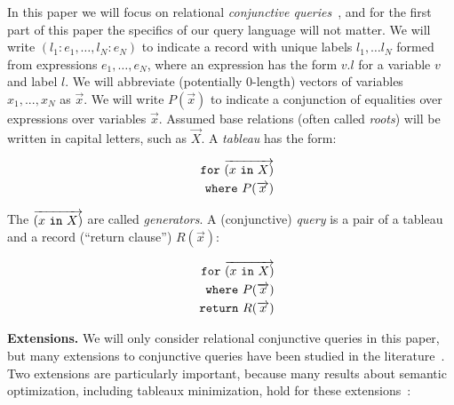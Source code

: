 \documentclass[preprint]{sigplanconf}
\newcommand{\FOR}{{\tt for} \ }
\newcommand{\WHERE}{{\tt where} \ }
\newcommand{\IN}{ \ {\tt in} \ }
\newcommand{\RETURN}{{\tt return} \ }
\begin{document}
In this paper we will focus on relational {\it conjunctive queries}~\cite{foundations}, and for the first part of this paper the specifics of our query language will not matter.   We will write $(l_1: e_1, \ldots, l_N: e_N)$ to indicate a record with unique labels $l_1, \ldots l_N$ formed from expressions $e_1, \ldots, e_N$, where an expression has the form $v.l$ for a variable $v$ and label $l$.  We will abbreviate (potentially 0-length) vectors of variables $x_1,...,x_N$ as $\overrightarrow{x}$.  We will write $P(\overrightarrow{x})$ to indicate a conjunction of equalities over expressions over variables $\overrightarrow{x}$.  Assumed base relations (often called {\it roots}) will be written in capital letters, such as $\overrightarrow{X}$.  A {\it tableau} has the form:
\begin{normalsize}
\begin{eqnarray*}
 & & \FOR \overrightarrow{(x \IN X)} \\
 & & \WHERE P(\overrightarrow{x})
\end{eqnarray*}
\end{normalsize}
The $\overrightarrow{(x \IN X)}$ are called {\it generators}.  A (conjunctive) {\it query} is a pair of a  tableau and a record (``return clause'') $R(\overrightarrow{x})$:
\begin{normalsize}
\begin{eqnarray*}
 & & \FOR \overrightarrow{(x \IN X)} \\
& & \WHERE  P(\overrightarrow{x}) \\ 
 & & \RETURN R(\overrightarrow{x})
\end{eqnarray*}
\end{normalsize}
{\bf Extensions.} We will only consider relational conjunctive queries in this paper, but many extensions to conjunctive queries have been studied in the literature~\cite{foundations}.  Two extensions are particularly important, because many results about semantic optimization, including tableaux minimization, hold for these extensions~\cite{Popa99anequational}:
\end{document}
